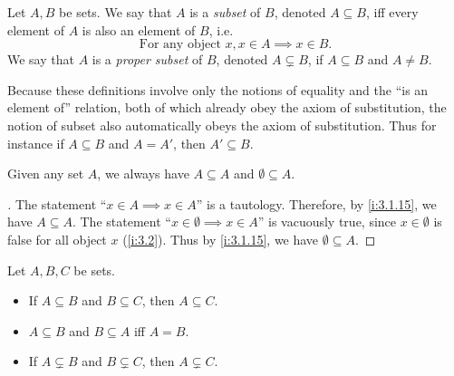 \begin{defn}[Subsets]\label{i:3.1.15}
  Let \(A, B\) be sets.
  We say that \(A\) is a \emph{subset} of \(B\), denoted \(A \subseteq B\), iff every element of \(A\) is also an element of \(B\), i.e.
  \[
    \text{For any object } x, x \in A \implies x \in B.
  \]
  We say that \(A\) is a \emph{proper subset} of \(B\), denoted \(A \subsetneq B\), if \(A \subseteq B\) and \(A \neq B\).
\end{defn}

\begin{rmk}\label{i:3.1.16}
  Because these definitions involve only the notions of equality and the ``is an element of'' relation, both of which already obey the axiom of substitution, the notion of subset also automatically obeys the axiom of substitution.
  Thus for instance if \(A \subseteq B\) and \(A = A'\), then \(A' \subseteq B\).
\end{rmk}

\begin{eg}\label{i:3.1.17}
  Given any set \(A\), we always have \(A \subseteq A\) and \(\emptyset \subseteq A\).
\end{eg}

\begin{proof}[]
  The statement ``\(x \in A \implies x \in A\)'' is a tautology.
  Therefore, by \cref{i:3.1.15}, we have \(A \subseteq A\).
  The statement ``\(x \in \emptyset \implies x \in A\)'' is vacuously true, since \(x \in \emptyset\) is false for all object \(x\) (\cref{i:3.2}).
  Thus by \cref{i:3.1.15}, we have \(\emptyset \subseteq A\).
\end{proof}

\begin{prop}\label{i:3.1.18}
  Let \(A, B, C\) be sets.
  \begin{itemize}
    \item If \(A \subseteq B\) and \(B \subseteq C\), then \(A \subseteq C\).
    \item \(A \subseteq B\) and \(B \subseteq A\) iff \(A = B\).
    \item If \(A \subsetneq B\) and \(B \subsetneq C\), then \(A \subsetneq C\).
  \end{itemize}
\end{prop}

